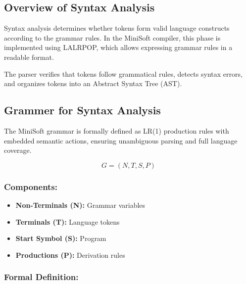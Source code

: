 \documentclass[12pt,a4paper]{article}
\begin{document}
\subsection{Overview of Syntax Analysis}
Syntax analysis determines whether tokens form valid language constructs according to the grammar rules. In the MiniSoft compiler, this phase is implemented using LALRPOP, which allows expressing grammar rules in a readable format.

The parser verifies that tokens follow grammatical rules, detects syntax errors, and organizes tokens into an Abstract Syntax Tree (AST).


\subsection{Grammer  for  Syntax Analysis}
The MiniSoft grammar is formally defined as LR(1) production rules with embedded semantic actions, ensuring unambiguous parsing and full language coverage.

\begin{equation*}
    G = (N, T, S, P)
    \end{equation*}
    
    \subsubsection*{Components:}
    \begin{itemize}
        \item \textbf{Non-Terminals (N):} Grammar variables
        \item \textbf{Terminals (T):} Language tokens
        \item \textbf{Start Symbol (S):} Program
        \item \textbf{Productions (P):} Derivation rules
    \end{itemize}
    
    \subsubsection*{Formal Definition:}
    
\end{document}

